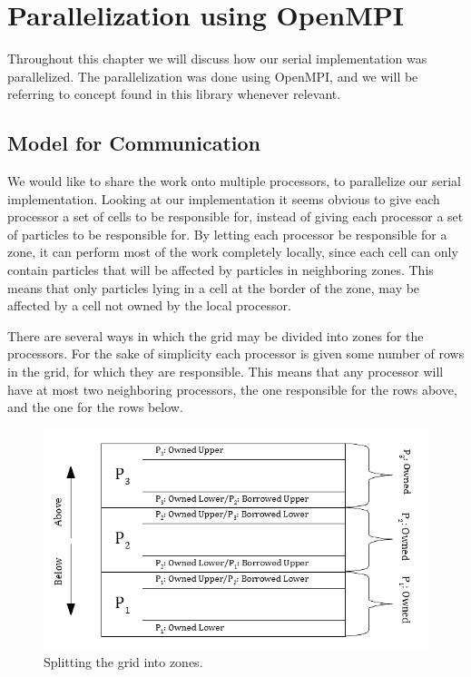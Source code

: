 \chapter{Parallelization using OpenMPI}

Throughout this chapter we will discuss how our serial implementation was parallelized. The parallelization was done
using OpenMPI, and we will be referring to concept found in this library whenever relevant.

\section{Model for Communication}

We would like to share the work onto multiple processors, to parallelize our serial implementation. Looking at our
implementation it seems obvious to give each processor a set of cells to be responsible for, instead of giving each
processor a set of particles to be responsible for. By letting each processor be responsible for a zone, it can
perform most of the work completely locally, since each cell can only contain particles that will be affected by
particles in neighboring zones. This means that only particles lying in a cell at the border of the zone, may be
affected by a cell not owned by the local processor.

There are several ways in which the grid may be divided into zones for the processors. For the sake of simplicity
each processor is given some number of rows in the grid, for which they are responsible. This means that any processor
will have at most two neighboring processors, the one responsible for the rows above, and the one for the rows below.

\begin{figure}[H]
  \centering
  \begin{minipage}[b]{0.9\textwidth}
    \includegraphics[width=\textwidth]{zones.png}
    \caption{Splitting the grid into zones.}
  \end{minipage}
  \label{fig:zones}
\end{figure}

